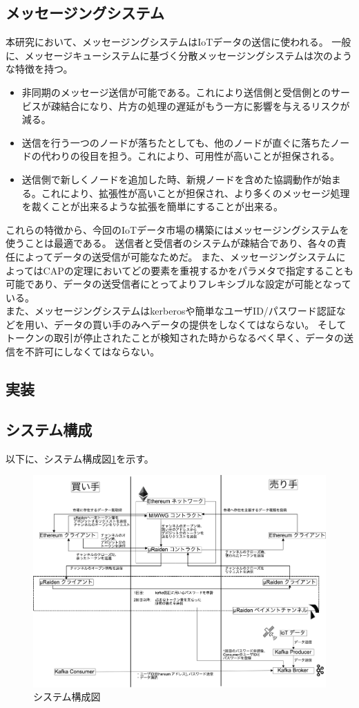 \subsection{メッセージングシステム}
本研究において、メッセージングシステムはIoTデータの送信に使われる。
一般に、メッセージキューシステムに基づく分散メッセージングシステムは次のような特徴を持つ。
\begin{itemize}
\item 非同期のメッセージ送信が可能である。これにより送信側と受信側とのサービスが疎結合になり、片方の処理の遅延がもう一方に影響を与えるリスクが減る。
\item 送信を行う一つのノードが落ちたとしても、他のノードが直ぐに落ちたノードの代わりの役目を担う。これにより、可用性が高いことが担保される。
\item 送信側で新しくノードを追加した時、新規ノードを含めた協調動作が始まる。これにより、拡張性が高いことが担保され、より多くのメッセージ処理を裁くことが出来るような拡張を簡単にすることが出来る。
\end{itemize}
これらの特徴から、今回のIoTデータ市場の構築にはメッセージングシステムを使うことは最適である。
送信者と受信者のシステムが疎結合であり、各々の責任によってデータの送受信が可能なためだ。
また、メッセージングシステムによってはCAPの定理においてどの要素を重視するかをパラメタで指定することも可能であり、データの送受信者にとってよりフレキシブルな設定が可能となっている。\\
また、メッセージングシステムはkerberosや簡単なユーザID/パスワード認証などを用い、データの買い手のみへデータの提供をしなくてはならない。
そしてトークンの取引が停止されたことが検知された時からなるべく早く、データの送信を不許可にしなくてはならない。

\subsection{実装}
\subsection{システム構成}
以下に、システム構成図\ref{SystemImplement}を示す。\\
\begin{figure}[htbp]
 \centering
  \includegraphics[width=160mm]{image/SystemImplement.png}
 \caption{システム構成図}
 \label{SystemImplement}
\end{figure}

